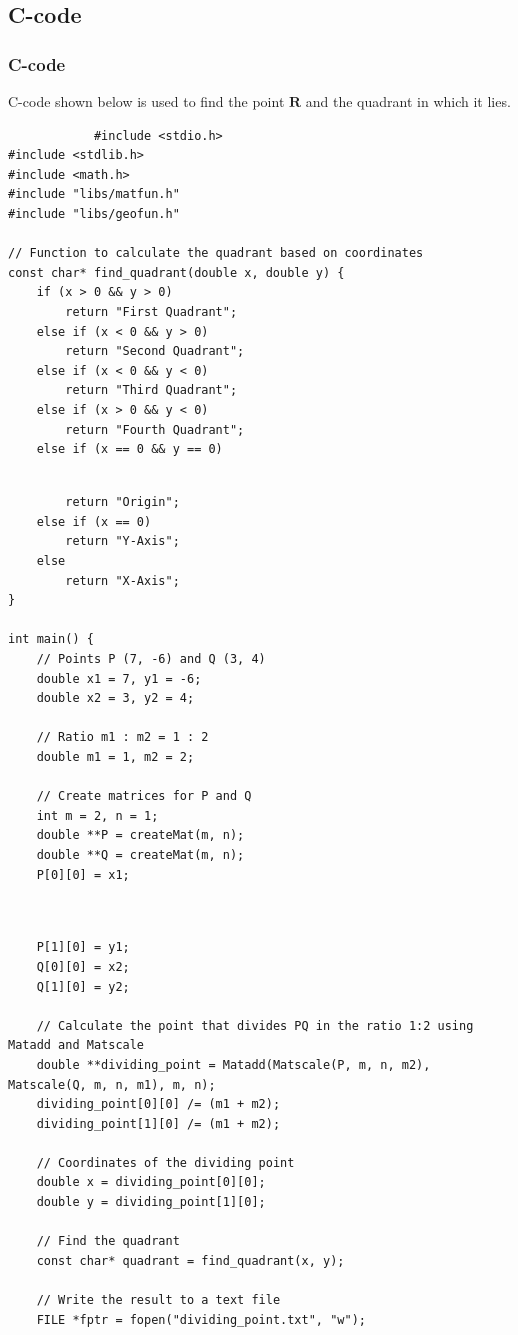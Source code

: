 \documentclass{beamer}
\theoremstyle{remark}
\let\vec\mathbf
\numberwithin{equation}{section}
\begin{document}
\subsection{C-code}
\begin{frame}[fragile]
\frametitle{C-code}
	C-code shown below is used to find the point $\vec{R}$ and the quadrant in which it lies.
 \lstset{style=Cstyle}
		\begin{lstlisting}
			#include <stdio.h>
#include <stdlib.h>
#include <math.h>
#include "libs/matfun.h"
#include "libs/geofun.h"

// Function to calculate the quadrant based on coordinates
const char* find_quadrant(double x, double y) {
    if (x > 0 && y > 0)
        return "First Quadrant";
    else if (x < 0 && y > 0)
        return "Second Quadrant";
    else if (x < 0 && y < 0)
        return "Third Quadrant";
    else if (x > 0 && y < 0)
        return "Fourth Quadrant";
    else if (x == 0 && y == 0)
    \end{lstlisting}
    \end{frame}
    \begin{frame}[fragile]
    \lstset{style=Cstyle}
    \begin{lstlisting}

        return "Origin";
    else if (x == 0)
        return "Y-Axis";
    else
        return "X-Axis";
}

int main() {
    // Points P (7, -6) and Q (3, 4)
    double x1 = 7, y1 = -6;
    double x2 = 3, y2 = 4;

    // Ratio m1 : m2 = 1 : 2
    double m1 = 1, m2 = 2;

    // Create matrices for P and Q
    int m = 2, n = 1;
    double **P = createMat(m, n);
    double **Q = createMat(m, n);
    P[0][0] = x1;
    
\end{lstlisting}
\end{frame}
    \begin{frame}[fragile]
    \lstset{style=Cstyle}
    \begin{lstlisting}
    
    P[1][0] = y1;
    Q[0][0] = x2;
    Q[1][0] = y2;

    // Calculate the point that divides PQ in the ratio 1:2 using Matadd and Matscale
    double **dividing_point = Matadd(Matscale(P, m, n, m2), Matscale(Q, m, n, m1), m, n);
    dividing_point[0][0] /= (m1 + m2);
    dividing_point[1][0] /= (m1 + m2);

    // Coordinates of the dividing point
    double x = dividing_point[0][0];
    double y = dividing_point[1][0];

    // Find the quadrant
    const char* quadrant = find_quadrant(x, y);

    // Write the result to a text file
    FILE *fptr = fopen("dividing_point.txt", "w");

    \end{lstlisting}
    \end{frame}
\end{document}
